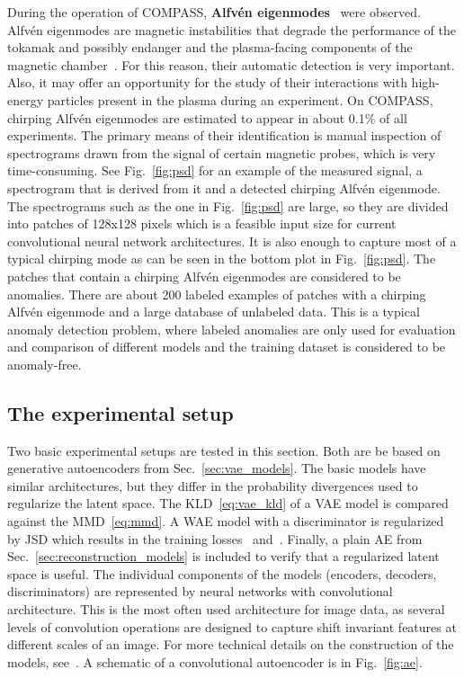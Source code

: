 During the operation of COMPASS, \textbf{Alfv\'en eigenmodes}~\cite{markovic2015alfven, melnikov2015quasicoherent, markovic2017alfven} were observed. Alfv\'en eigenmodes are magnetic instabilities that degrade the performance of the tokamak and possibly endanger and the plasma-facing components of the magnetic chamber~\cite{mett1992kinetic}. For this reason, their automatic detection is very important. Also, it may offer an opportunity for the study of their interactions with high-energy particles present in the plasma during an experiment. On COMPASS, chirping Alfv\'en eigenmodes are estimated to appear in about 0.1\% of all experiments. The primary means of their identification is manual inspection of spectrograms drawn from the signal of certain magnetic probes, which is very time-consuming. See Fig.~\ref{fig:psd} for an example of the measured signal, a spectrogram that is derived from it and a detected chirping Alfv\'en eigenmode. The spectrograms such as the one in Fig.~\ref{fig:psd} are large, so they are divided into patches of 128x128 pixels which is a feasible input size for current convolutional neural network architectures. It is also enough to capture most of a typical chirping mode as can be seen in the bottom plot in Fig.~\ref{fig:psd}. The patches that contain a chirping Alfv\'en eigenmodes are considered to be anomalies. There are about 200 labeled examples of patches with a chirping Alfv\'en eigenmode and a large database of unlabeled data. This is a typical anomaly detection problem, where labeled anomalies are only used for evaluation and comparison of different models and the training dataset is considered to be anomaly-free.

\subsection{The experimental setup}
Two basic experimental setups are tested in this section. Both are be based on generative autoencoders from Sec.~\ref{sec:vae_models}. The basic models have similar architectures, but they differ in the probability divergences used to regularize the latent space. The KLD~\eqref{eq:vae_kld} of a VAE model is compared against the MMD~\eqref{eq:mmd}. A WAE model with a discriminator is regularized by JSD which results in the training losses~\cite{eq:aae_loss_disc} and~\cite{eq:aae_loss_autoencoder}. Finally, a plain AE from Sec.~\ref{sec:reconstruction_models} is included to verify that a regularized latent space is useful. The individual components of the models (encoders, decoders, discriminators) are represented by neural networks with convolutional architecture. This is the most often used architecture for image data, as several levels of convolution operations are designed to capture shift invariant features at different scales of an image. For more technical details on the construction of the models, see~\cite{vskvara2020detection}. A schematic of a convolutional autoencoder is in Fig.~\ref{fig:ae}.

